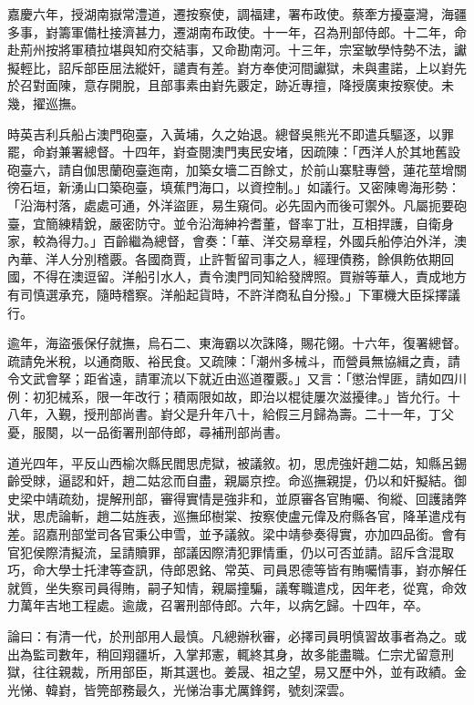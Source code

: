 \begin{pinyinscope}
嘉慶六年，授湖南嶽常澧道，遷按察使，調福建，署布政使。蔡牽方擾臺灣，海疆多事，崶籌軍備杜接濟甚力，遷湖南布政使。十一年，召為刑部侍郎。十二年，命赴荊州按將軍積拉堪與知府交結事，又命勘南河。十三年，宗室敏學恃勢不法，讞擬輕比，詔斥部臣屈法縱奸，譴責有差。崶方奉使河間讞獄，未與畫諾，上以崶先於召對面陳，意存開脫，且部事素由崶先覈定，跡近專擅，降授廣東按察使。未幾，擢巡撫。

時英吉利兵船占澳門砲臺，入黃埔，久之始退。總督吳熊光不即遣兵驅逐，以罪罷，命崶兼署總督。十四年，崶查閱澳門夷民安堵，因疏陳：「西洋人於其地舊設砲臺六，請自伽思蘭砲臺迤南，加築女墻二百餘丈，於前山寨駐專營，蓮花莖增關徬石垣，新湧山口築砲臺，填蕉門海口，以資控制。」如議行。又密陳粵海形勢：「沿海村落，處處可通，外洋盜匪，易生窺伺。必先固內而後可禦外。凡屬扼要砲臺，宜簡練精銳，嚴密防守。並令沿海紳衿耆董，督率丁壯，互相捍護，自衛身家，較為得力。」百齡繼為總督，會奏：「華、洋交易章程，外國兵船停泊外洋，澳內華、洋人分別稽覈。各國商賈，止許暫留司事之人，經理債務，餘俱飭依期回國，不得在澳逗留。洋船引水人，責令澳門同知給發牌照。買辦等華人，責成地方有司慎選承充，隨時稽察。洋船起貨時，不許洋商私自分撥。」下軍機大臣採擇議行。

逾年，海盜張保仔就撫，烏石二、東海霸以次誅降，賜花翎。十六年，復署總督。疏請免米稅，以通商販、裕民食。又疏陳：「潮州多械斗，而營員無協緝之責，請令文武會拏；距省遠，請軍流以下就近由巡道覆覈。」又言：「懲治悍匪，請如四川例：初犯械系，限一年改行；積兩限如故，即治以棍徒屢次滋擾律。」皆允行。十八年，入覲，授刑部尚書。崶父是升年八十，給假三月歸為壽。二十一年，丁父憂，服闋，以一品銜署刑部侍郎，尋補刑部尚書。

道光四年，平反山西榆次縣民閻思虎獄，被議敘。初，思虎強奸趙二姑，知縣呂錫齡受賕，逼認和奸，趙二姑忿而自盡，親屬京控。命巡撫親提，仍以和奸擬結。御史梁中靖疏劾，提解刑部，審得實情是強非和，並原審各官賄囑、徇縱、回護諸弊狀，思虎論斬，趙二姑旌表，巡撫邱樹棠、按察使盧元偉及府縣各官，降革遣戍有差。詔嘉刑部堂司各官秉公申雪，並予議敘。梁中靖參奏得實，亦加四品銜。會有官犯侯際清擬流，呈請贖罪，部議因際清犯罪情重，仍以可否並請。詔斥含混取巧，命大學士托津等查訊，侍郎恩銘、常英、司員恩德等皆有賄囑情事，崶亦解任就質，坐失察司員得賄，嗣子知情，親屬撞騙，議奪職遣戍，因年老，從寬，命效力萬年吉地工程處。逾歲，召署刑部侍郎。六年，以病乞歸。十四年，卒。

論曰：有清一代，於刑部用人最慎。凡總辦秋審，必擇司員明慎習故事者為之。或出為監司數年，稍回翔疆圻，入掌邦憲，輒終其身，故多能盡職。仁宗尤留意刑獄，往往親裁，所用部臣，斯其選也。姜晟、祖之望，易又歷中外，並有政績。金光悌、韓崶，皆筦部務最久，光悌治事尤厲鋒鍔，號刻深雲。


\end{pinyinscope}